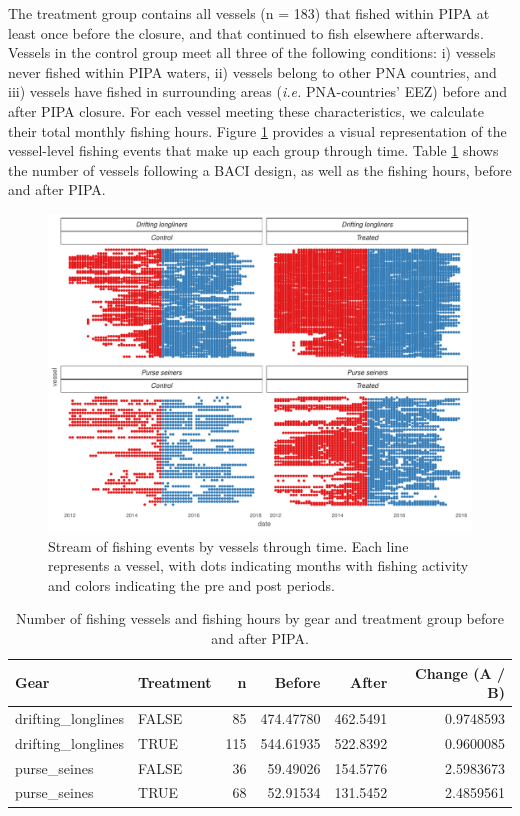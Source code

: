 \documentclass[12pt,]{article}
\begin{document}
The treatment group contains all vessels (n = 183) that fished within
PIPA at least once before the closure, and that continued to fish
elsewhere afterwards. Vessels in the control group meet all three of the
following conditions: i) vessels never fished within PIPA waters, ii)
vessels belong to other PNA countries, and iii) vessels have fished in
surrounding areas (\emph{i.e.} PNA-countries' EEZ) before and after PIPA
closure. For each vessel meeting these characteristics, we calculate
their total monthly fishing hours. Figure \ref{fig:baci_strict} provides
a visual representation of the vessel-level fishing events that make up
each group through time. Table \ref{tab:baci_n_s} shows the number of
vessels following a BACI design, as well as the fishing hours, before
and after PIPA.

\begin{figure}
\centering
\includegraphics{Manuscript_files/figure-latex/unnamed-chunk-4-1.pdf}
\caption{\label{fig:unnamed-chunk-4}\label{fig:baci_strict}Stream of fishing
events by vessels through time. Each line represents a vessel, with dots
indicating months with fishing activity and colors indicating the pre
and post periods.}
\end{figure}

\begin{table}[H]

\caption{\label{tab:unnamed-chunk-5}\label{tab:baci_n_s}Number of fishing vessels and fishing hours by gear and treatment group before and after PIPA.}
\centering
\begin{tabular}[t]{llrrrr}
\toprule
Gear & Treatment & n & Before & After & Change (A / B)\\
\midrule
drifting\_longlines & FALSE & 85 & 474.47780 & 462.5491 & 0.9748593\\
drifting\_longlines & TRUE & 115 & 544.61935 & 522.8392 & 0.9600085\\
purse\_seines & FALSE & 36 & 59.49026 & 154.5776 & 2.5983673\\
purse\_seines & TRUE & 68 & 52.91534 & 131.5452 & 2.4859561\\
\bottomrule
\end{tabular}
\end{table}
\end{document}
